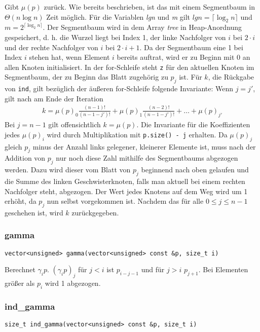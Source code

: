 \documentclass[a4paper, 10pt, ngerman]{article}
\begin{document}
\noindent Gibt $\mu(p)$ zurück. Wie bereits beschrieben, ist das mit einem Segmentbaum in $\Theta(n \log n)$ Zeit möglich. Für die Variablen \emph{lgn} und \emph{m} gilt $lgn = \lceil \log_2 n \rceil$ und $m = 2^{\lceil \log_2 n \rceil}$. Der Segmentbaum wird in dem Array \emph{tree} in Heap-Anordnung gespeichert, d. h. die Wurzel liegt bei Index 1, der linke Nachfolger von $i$ bei $2 \cdot i$ und der rechte Nachfolger von $i$ bei $2 \cdot i + 1$. Da der Segmentbaum eine 1 bei Index $i$ stehen hat, wenn Element $i$ bereits auftrat, wird er zu Beginn mit 0 an allen Knoten initialisiert. In der for-Schleife steht \verb|z| für den aktuellen Knoten im Segmentbaum, der zu Beginn das Blatt zugehörig zu $p_j$ ist. Für $k$, die Rückgabe von \verb|ind|, gilt bezüglich der äußeren for-Schleife folgende Invariante: Wenn $j = j'$, gilt nach am Ende der Iteration
\begin{align*}
    k = \mu(p)_0 \frac {(n - 1)!} {(n - 1 - j')!} + \mu(p)_1 \frac {(n - 2)!} {(n - 1 - j')!} + \dots + \mu(p)_{j'}
\end{align*}
Bei $j = n - 1$ gilt offensichtlich $k = \mu(p)$. Die Invariante für die Koeffizienten jedes $\mu(p)_i$ wird durch Multiplikation mit \verb|p.size() - j| erhalten. Da $\mu(p)_j$ gleich $p_j$ minus der Anzahl links gelegener, kleinerer Elemente ist, muss nach der Addition von $p_j$ nur noch diese Zahl mithilfe des Segmentbaums abgezogen werden. Dazu wird dieser vom Blatt von $p_j$ beginnend nach oben gelaufen und die Summe des linken Geschwisterknoten, falls man aktuell bei einem rechten Nachfolger steht, abgezogen. Der Wert jedes Knotens auf dem Weg wird um 1 erhöht, da $p_j$ nun selbst vorgekommen ist. Nachdem das für alle $0 \le j \le n - 1$ geschehen ist, wird $k$ zurückgegeben.

\subsubsection{gamma}
\verb|vector<unsigned> gamma(vector<unsigned> const &p, size_t i)|
\medskip

\noindent Berechnet $\gamma_i p$. $(\gamma_i p)_j$ für $j < i$ ist $p_{i - j - 1}$ und für $j > i$ $p_{j + 1}$. Bei Elementen größer als $p_i$ wird 1 abgezogen.

\subsubsection{ind\_gamma}
\verb|size_t ind_gamma(vector<unsigned> const &p, size_t i)|
\medskip
\end{document}
